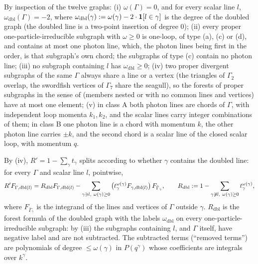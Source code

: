 By inspection of the twelve graphs: (i) $\omega(\Gamma)=0$, and for every scalar line $l$, $\omega_{\mathrm{dbl}}(\Gamma)=-2$, where $\omega_{\mathrm{dbl}}(\gamma):=\omega(\gamma)-2\cdot\mathbf 1[l\in\gamma]$ is the degree of the doubled graph (the doubled line is a two-point insertion of degree $0$); (ii) every proper one-particle-irreducible subgraph with $\omega\ge0$ is one-loop, of type (a), (c) or (d), and contains at most one photon line, which, the photon lines being first in the order, is that subgraph's own chord; the subgraphs of type (c) contain no photon line; (iii) no subgraph containing $l$ has $\omega_{\mathrm{dbl}}\ge0$; (iv) two proper divergent subgraphs of the same $\Gamma$ always share a line or a vertex (the triangles of $\Gamma_2$ overlap, the swordfish vertices of $\Gamma_7$ share the seagull), so the forests of proper subgraphs in the sense of \cite[Sect.~2]{Rei88b} (members nested or with no common lines and vertices) have at most one element; (v) in class A both photon lines are chords of $\Gamma$, with independent loop momenta $k_1,k_2$, and the scalar lines carry integer combinations of them; in class B one photon line is a chord with momentum $k$, the other photon line carries $\pm k$, and the second chord is a scalar line of the closed scalar loop, with momentum $q$.

By (iv), $R'=1-\sum_\gamma t_\gamma$ splits according to whether $\gamma$ contains the doubled line: for every $\Gamma$ and scalar line $l$, pointwise,
\begin{equation}\label{eq:a05:OS}
R'F_{\Gamma,\mathrm{dbl}(l)}=R_{\mathrm{dbl}}F_{\Gamma,\mathrm{dbl}(l)}-\sum_{\gamma\ni l,\ \omega(\gamma)\ge0}\big(t^{\omega(\gamma)}_\gamma F_{\gamma,\mathrm{dbl}(l)}\big)\,F_{\bar\Gamma_\gamma},
\qquad R_{\mathrm{dbl}}\defeq1-\sum_{\gamma\not\ni l,\ \omega(\gamma)\ge0}t^{\omega(\gamma)}_\gamma ,
\end{equation}
where $F_{\bar\Gamma_\gamma}$ is the integrand of the lines and vertices of $\Gamma$ outside $\gamma$. $R_{\mathrm{dbl}}$ is the forest formula of the doubled graph with the labels $\omega_{\mathrm{dbl}}$ on every one-particle-irreducible subgraph: by (iii) the subgraphs containing $l$, and $\Gamma$ itself, have negative label and are not subtracted. The subtracted terms (``removed terms'') are polynomials of degree $\le\omega(\gamma)$ in $P(q^\gamma)$ whose coefficients are integrals over $k^\gamma$.

